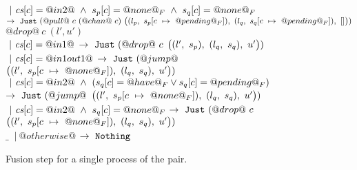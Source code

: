 \begin{figure*}
\begin{tabbing}
\> \> $~|~\cs[c]=@in2@ ~\wedge~ s_p[c]=@none@_F ~\wedge~ s_q[c]=@none@_F$ \\
\> \> $\to~\Just (@pull@~c~(@chan@~c)~
      \nextStep
        {l_p}
          {\HeapUpdateOne{c}{@pending@_F}{s_p}}
        {l_q}
          {\HeapUpdateOne{c}{@pending@_F}{s_q}}
        {[]})
  $
\> \> \> 
\\[1ex]

\> $@drop@~c~(l',u')$ \\
\> \> $~|~\cs[c]=@in1@$
\> \hspace{5em} $\to~\Just (@drop@~c$
\> \hspace{5em} $
      \nextStep
        {l'}
          {s_p}
        {l_q}
          {s_q}
        {u'})
      $
\>  \\

\> \> $~|~\cs[c]=@in1out1@$
\> \hspace{5em} $\to~\Just (@jump@$
\> \hspace{5em} $
      \nextStep
        {l'}
          {\HeapUpdateOne{c}{@none@_F}{s_p}}
        {l_q}
          {s_q}
        {u'})
      $
\> \\

\> \> $~|~\cs[c]=@in2@ ~\wedge~ (s_q[c]=@have@_F \vee s_q[c]=@pending@_F)$ 
\> \hspace{5em} $\to~\Just (@jump@$
\> \hspace{5em} $
      \nextStep
        {l'}
          {\HeapUpdateOne{c}{@none@_F}{s_p}}
        {l_q}
          {s_q}
        {u'})
      $
\> \\



\> \> $~|~\cs[c]=@in2@ ~\wedge~ s_q[c]=@none@_F$
\> \hspace{5em} $\to~\Just (@drop@~c$
\> \hspace{5em} $
      \nextStep
        {l'}
          {\HeapUpdateOne{c}{@none@_F}{s_p}}
        {l_q}
          {s_q}
        {u'})
      $
\> \\[1ex]

\> $\_$ \> $~|~ @otherwise@ $
\> \hspace{5em} $\to ~ \Nothing$
\> \> 

\end{tabbing}

\caption{Fusion step for a single process of the pair.} 

\label{fig:Fusion:Def:Step}
\end{figure*}

